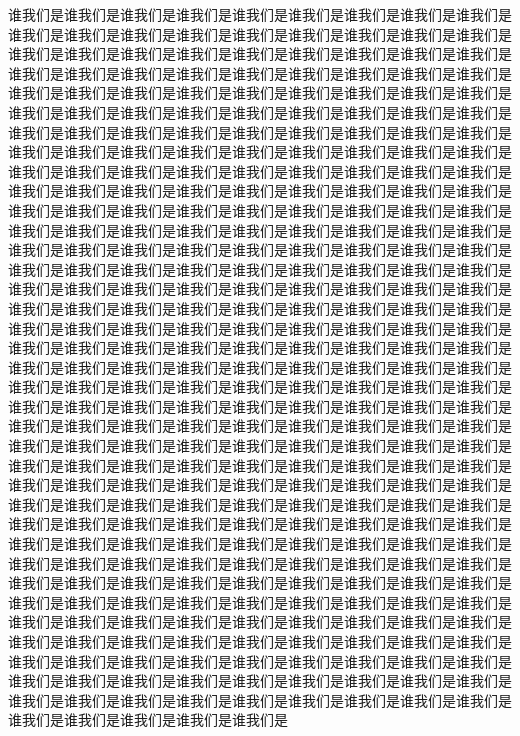 \documentclass[twocolumn]{cvertbook}
\begin{document}
谁我们是谁我们是谁我们是谁我们是谁我们是谁我们是谁我们是谁我们是谁我们是谁我们是谁我们是谁我们是谁我们是谁我们是谁我们是谁我们是谁我们是谁我们是谁我们是谁我们是谁我们是谁我们是谁我们是谁我们是谁我们是谁我们是谁我们是谁我们是谁我们是谁我们是谁我们是谁我们是谁我们是谁我们是谁我们是谁我们是谁我们是谁我们是谁我们是谁我们是谁我们是谁我们是谁我们是谁我们是谁我们是谁我们是谁我们是谁我们是谁我们是谁我们是谁我们是谁我们是谁我们是谁我们是谁我们是谁我们是谁我们是谁我们是谁我们是谁我们是谁我们是谁我们是谁我们是谁我们是谁我们是谁我们是谁我们是谁我们是谁我们是谁我们是谁我们是谁我们是谁我们是谁我们是谁我们是谁我们是谁我们是谁我们是谁我们是谁我们是谁我们是谁我们是谁我们是谁我们是谁我们是谁我们是谁我们是谁我们是谁我们是谁我们是谁我们是谁我们是谁我们是谁我们是谁我们是谁我们是谁我们是谁我们是谁我们是谁我们是谁我们是谁我们是谁我们是谁我们是谁我们是谁我们是谁我们是谁我们是谁我们是谁我们是谁我们是谁我们是谁我们是谁我们是谁我们是谁我们是谁我们是谁我们是谁我们是谁我们是谁我们是谁我们是谁我们是谁我们是谁我们是谁我们是谁我们是谁我们是谁我们是谁我们是谁我们是谁我们是谁我们是谁我们是谁我们是谁我们是谁我们是谁我们是谁我们是谁我们是谁我们是谁我们是谁我们是谁我们是谁我们是谁我们是谁我们是谁我们是谁我们是谁我们是谁我们是谁我们是谁我们是谁我们是谁我们是谁我们是谁我们是谁我们是谁我们是谁我们是谁我们是谁我们是谁我们是谁我们是谁我们是谁我们是谁我们是谁我们是谁我们是谁我们是谁我们是谁我们是谁我们是谁我们是谁我们是谁我们是谁我们是谁我们是谁我们是谁我们是谁我们是谁我们是谁我们是谁我们是谁我们是谁我们是谁我们是谁我们是谁我们是谁我们是谁我们是谁我们是谁我们是谁我们是谁我们是谁我们是谁我们是谁我们是谁我们是谁我们是谁我们是谁我们是谁我们是谁我们是谁我们是谁我们是谁我们是谁我们是谁我们是谁我们是谁我们是谁我们是谁我们是谁我们是谁我们是谁我们是谁我们是谁我们是谁我们是谁我们是谁我们是谁我们是谁我们是谁我们是谁我们是谁我们是谁我们是谁我们是谁我们是谁我们是谁我们是谁我们是谁我们是谁我们是谁我们是谁我们是谁我们是谁我们是谁我们是谁我们是谁我们是谁我们是谁我们是谁我们是谁我们是谁我们是谁我们是谁我们是谁我们是谁我们是谁我们是谁我们是谁我们是谁我们是谁我们是谁我们是谁我们是谁我们是谁我们是谁我们是谁我们是谁我们是谁我们是谁我们是谁我们是谁我们是谁我们是谁我们是谁我们是谁我们是谁我们是谁我们是谁我们是谁我们是谁我们是谁我们是谁我们是谁我们是谁我们是谁我们是谁我们是谁我们是谁我们是谁我们是谁我们是谁我们是谁我们是谁我们是谁我们是谁我们是谁我们是谁我们是谁我们是谁我们是谁我们是谁我们是谁我们是谁我们是谁我们是谁我们是谁我们是谁我们是谁我们是谁我们是谁我们是谁我们是谁我们是谁我们是谁我们是谁我们是谁我们是谁我们是谁我们是谁我们是谁我们是谁我们是谁我们是谁我们是谁我们是谁我们是谁我们是谁我们是谁我们是谁我们是谁我们是谁我们是谁我们是谁我们是谁我们是
\end{document}
